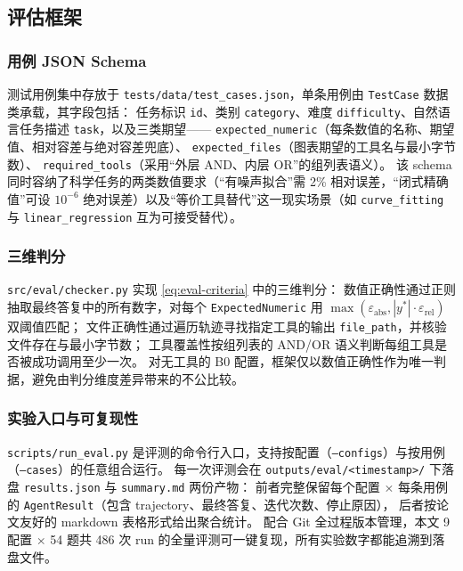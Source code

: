 \subsection{评估框架}\label{sec:eval-framework}

\subsubsection{用例 JSON Schema}

测试用例集中存放于 \texttt{tests/data/test\_cases.json}，单条用例由 \texttt{TestCase} 数据类承载，其字段包括：
任务标识 \texttt{id}、类别 \texttt{category}、难度 \texttt{difficulty}、自然语言任务描述 \texttt{task}，以及三类期望——
\texttt{expected\_numeric}（每条数值的名称、期望值、相对容差与绝对容差兜底）、
\texttt{expected\_files}（图表期望的工具名与最小字节数）、
\texttt{required\_tools}（采用“外层 AND、内层 OR”的组列表语义）。
该 schema 同时容纳了科学任务的两类数值要求（“有噪声拟合”需 2\% 相对误差，“闭式精确值”可设 $10^{-6}$ 绝对误差）以及“等价工具替代”这一现实场景（如 \texttt{curve\_fitting} 与 \texttt{linear\_regression} 互为可接受替代）。

\subsubsection{三维判分}

\texttt{src/eval/checker.py} 实现 \autoref{eq:eval-criteria} 中的三维判分：
数值正确性通过正则抽取最终答复中的所有数字，对每个 \texttt{ExpectedNumeric} 用 $\max(\varepsilon_{\text{abs}}, |y^{*}|\cdot\varepsilon_{\text{rel}})$ 双阈值匹配；
文件正确性通过遍历轨迹寻找指定工具的输出 \texttt{file\_path}，并核验文件存在与最小字节数；
工具覆盖性按组列表的 AND/OR 语义判断每组工具是否被成功调用至少一次。
对无工具的 B0 配置，框架仅以数值正确性作为唯一判据，避免由判分维度差异带来的不公比较。

\subsubsection{实验入口与可复现性}

\texttt{scripts/\allowbreak run\_eval.py} 是评测的命令行入口，支持按配置（\texttt{--configs}）与按用例（\texttt{--cases}）的任意组合运行。
每一次评测会在 \texttt{outputs/\allowbreak eval/<timestamp>/} 下落盘 \texttt{results.json} 与 \texttt{summary.md} 两份产物：
前者完整保留每个配置 $\times$ 每条用例的 \texttt{AgentResult}（包含 trajectory、最终答复、迭代次数、停止原因），
后者按论文友好的 markdown 表格形式给出聚合统计。
配合 Git 全过程版本管理，本文 9 配置 $\times$ 54 题共 486 次 run 的全量评测可一键复现，所有实验数字都能追溯到落盘文件。
